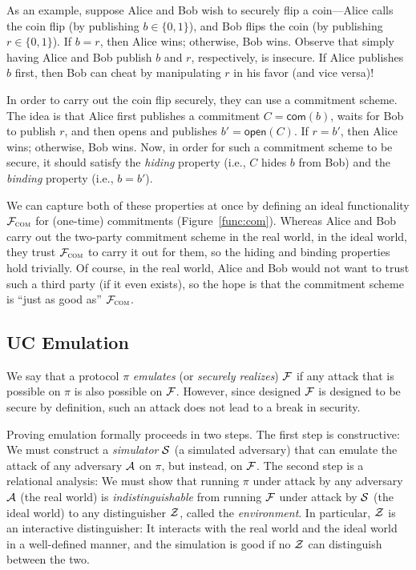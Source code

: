 As an example, suppose Alice and Bob wish to securely flip a coin---Alice calls
the coin flip (by publishing $b \in \{ 0, 1\}$), and Bob flips the coin (by
publishing $r \in \{0, 1\}$). If $b = r$, then Alice wins; otherwise, Bob
wins. Observe that simply having Alice and Bob publish $b$ and $r$,
respectively, is insecure. If Alice publishes $b$ first, then Bob can cheat by
manipulating $r$ in his favor (and vice versa)!

In order to carry out the coin flip securely, they can use a commitment
scheme. The idea is that Alice first publishes a commitment $C =
\mathsf{com}(b)$, waits for Bob to publish $r$, and then opens and publishes $b'
= \mathsf{open}(C)$. If $r = b'$, then Alice wins; otherwise, Bob wins.  Now, in
order for such a commitment scheme to be secure, it should satisfy the
\emph{hiding} property (i.e., $C$ hides $b$ from Bob) and the \emph{binding}
property (i.e., $b=b'$).

We can capture both of these properties at once by defining an ideal
functionality $\mathcal{{F}}_{\textsc{com}}$ for (one-time) commitments
(Figure~\ref{func:com}). Whereas Alice and Bob carry out the two-party
commitment scheme in the real world, in the ideal world, they trust
$\mathcal{{F}}_{\textsc{com}}$ to carry it out for them, so the hiding and binding
properties hold trivially. Of course, in the real world, Alice and Bob would not
want to trust such a third party (if it even exists), so the hope is that the
commitment scheme is ``just as good as'' $\mathcal{{F}}_{\textsc{com}}$.

\subsection{UC Emulation}
\label{subsec:emulation}

We say that a protocol $\pi$ \emph{emulates} (or \emph{securely realizes})
$\mathcal{{F}}$ if any attack that is possible on $\pi$ is also possible on
$\mathcal{{F}}$. However, since designed $\mathcal{{F}}$ is designed to be secure by
definition, such an attack does not lead to a break in security.

Proving emulation formally proceeds in two steps. The first step is
constructive: We must construct a \emph{simulator} $\mathcal{{S}}$ (a simulated
adversary) that can emulate the attack of any adversary $\mathcal{{A}}$ on $\pi$, but
instead, on $\mathcal{{F}}$. The second step is a relational analysis: We must show
that running $\pi$ under attack by any adversary $\mathcal{{A}}$ (the real world) is
\emph{indistinguishable} from running $\mathcal{{F}}$ under attack by $\mathcal{{S}}$ (the
ideal world) to any distinguisher $\mathcal{{Z}}$, called the \emph{environment}. In
particular, $\mathcal{{Z}}$ is an interactive distinguisher: It interacts with the real
world and the ideal world in a well-defined manner, and the simulation is good
if no $\mathcal{{Z}}$ can distinguish between the two.

